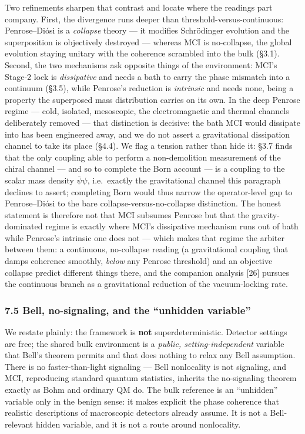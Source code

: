 \documentclass[
]{article}
\newcounter{none} %
\begin{document}
Two refinements sharpen that contrast and locate where the readings part
company. First, the divergence runs deeper than
threshold-versus-continuous: Penrose--Diósi is a \emph{collapse} theory
--- it modifies Schrödinger evolution and the superposition is
objectively destroyed --- whereas MCI is no-collapse, the global
evolution staying unitary with the coherence scrambled into the bulk
(§3.1). Second, the two mechanisms ask opposite things of the
environment: MCI's Stage-2 lock is \emph{dissipative} and needs a bath
to carry the phase mismatch into a continuum (§3.5), while Penrose's
reduction is \emph{intrinsic} and needs none, being a property the
superposed mass distribution carries on its own. In the deep Penrose
regime --- cold, isolated, mesoscopic, the electromagnetic and thermal
channels deliberately removed --- that distinction is decisive: the bath
MCI would dissipate into has been engineered away, and we do not assert
a gravitational dissipation channel to take its place (§4.4). We flag a
tension rather than hide it: §3.7 finds that the only coupling able to
perform a non-demolition measurement of the chiral channel --- and so to
complete the Born account --- is a coupling to the scalar mass density
\(\bar\psi\psi\), i.e.~exactly the gravitational channel this paragraph
declines to assert; completing Born would thus narrow the operator-level
gap to Penrose--Diósi to the bare collapse-versus-no-collapse
distinction. The honest statement is therefore not that MCI subsumes
Penrose but that the gravity-dominated regime is exactly where MCI's
dissipative mechanism runs out of bath while Penrose's intrinsic one
does not --- which makes that regime the arbiter between them: a
continuous, no-collapse reading (a gravitational coupling that damps
coherence smoothly, \emph{below} any Penrose threshold) and an objective
collapse predict different things there, and the companion analysis
{[}26{]} pursues the continuous branch as a gravitational reduction of
the vacuum-locking rate.

\subsubsection{7.5 Bell, no-signaling, and the ``unhidden
variable''}\label{bell-no-signaling-and-the-unhidden-variable}

We restate plainly: the framework is \textbf{not} superdeterministic.
Detector settings are free; the shared bulk environment is a
\emph{public, setting-independent} variable that Bell's theorem permits
and that does nothing to relax any Bell assumption. There is no
faster-than-light signaling --- Bell nonlocality is not signaling, and
MCI, reproducing standard quantum statistics, inherits the no-signaling
theorem exactly as Bohm and ordinary QM do. The bulk reference is an
``unhidden'' variable only in the benign sense: it makes explicit the
phase coherence that realistic descriptions of macroscopic detectors
already assume. It is not a Bell-relevant hidden variable, and it is not
a route around nonlocality.
\end{document}

